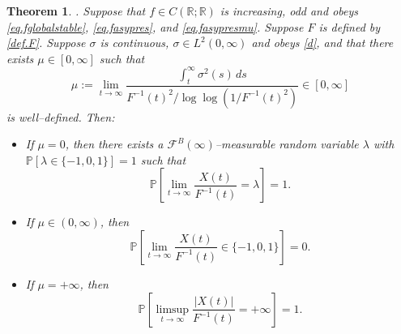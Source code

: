 \documentclass[a4paper,10pt,reqno]{amsart}
\numberwithin{equation}{section}
\newtheorem{theorem}{Theorem}
\theoremstyle{definition}
\theoremstyle{remark}
\DeclareMathOperator{\1}{\mathbbm 1}
\begin{document}
	\begin{theorem}  \label{thm.Xwithouttailmart}.
		Suppose that $f\in C(\mathbb{R};\mathbb{R})$ is increasing, odd and obeys \eqref{eq.fglobalstable}, \eqref{eq.fasypres}, and \eqref{eq.fasypresmu}. Suppose $F$ is defined by \eqref{def.F}. 
		Suppose $\sigma$ is continuous, $\sigma \in L^2(0,\infty)$ and obeys \eqref{d}, and that there exists $\mu \in [0,\infty]$ such that
		\[
		\mu := \lim_{t \to \infty} \frac{\int_t^\infty \sigma^2(s)\, ds }{F^{-1}(t)^2/\log\log(1/F^{-1}(t)^2)}\in [0,\infty]
		\]
		is well--defined. Then:
		\begin{itemize}
			\item[(i)] If $\mu = 0$, then there exists a $\mathcal{F}^B(\infty)$--measurable random variable $\lambda$ with $\mathbb{P}[\lambda\in \{-1,0,1\}]=1$ such that 
			\[
			\mathbb{P}\left[ \lim_{t \to \infty} \frac{X(t)}{F^{-1}(t)} =\lambda \right] = 1.
			\]
			\item[(ii)] If $\mu \in (0,\infty)$, then
			\[
			\mathbb{P}\left[ \lim_{t \to \infty} \frac{X(t)}{F^{-1}(t)} \in \{-1,0,1\} \right] = 0.
			\]
			\item[(iii)] If $\mu=+\infty$, then 
			\[
			\mathbb{P}\left[ \limsup_{t \to \infty} \frac{|X(t)|}{F^{-1}(t)} =+\infty \right] = 1.
			\]
		\end{itemize}
	\end{theorem}
\end{document}
